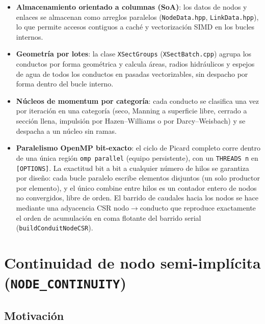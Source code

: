 \documentclass[11pt,a4paper]{article}
\begin{document}
\begin{itemize}[nosep]
  \item \textbf{Almacenamiento orientado a columnas (SoA)}: los datos de nodos
        y enlaces se almacenan como arreglos paralelos (\texttt{NodeData.hpp},
        \texttt{LinkData.hpp}), lo que permite accesos contiguos a caché y
        vectorización SIMD en los bucles internos.
  \item \textbf{Geometría por lotes}: la clase \texttt{XSectGroups}
        (\texttt{XSectBatch.cpp}) agrupa los conductos por forma geométrica y
        calcula áreas, radios hidráulicos y espejos de agua de todos los
        conductos en pasadas vectorizables, sin despacho por forma dentro del
        bucle interno.
  \item \textbf{Núcleos de momentum por categoría}: cada conducto se clasifica
        una vez por iteración en una categoría (seco, Manning a superficie
        libre, cerrado a sección llena, impulsión por Hazen--Williams o por
        Darcy--Weisbach) y se despacha a un núcleo sin ramas.
  \item \textbf{Paralelismo OpenMP bit-exacto}: el ciclo de Picard completo
        corre dentro de una única región \texttt{omp parallel} (equipo
        persistente), con un \texttt{THREADS n} en \texttt{[OPTIONS]}. La
        exactitud bit a bit a cualquier número de hilos se garantiza por
        diseño: cada bucle paralelo escribe elementos disjuntos (un solo
        productor por elemento), y el único combine entre hilos es un contador
        entero de nodos no convergidos, libre de orden. El barrido de
        caudales hacia los nodos se hace mediante una adyacencia CSR
        nodo$\to$conducto que reproduce exactamente el orden de acumulación en
        coma flotante del barrido serial (\texttt{buildConduitNodeCSR}).
\end{itemize}

\section{Continuidad de nodo semi-implícita (\texttt{NODE\_CONTINUITY})}

\subsection{Motivación}
\end{document}
